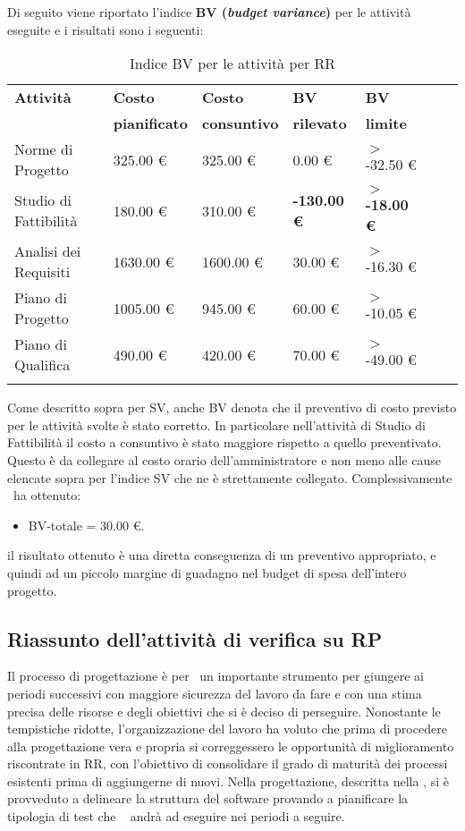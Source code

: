 Di seguito viene riportato l'indice \textbf{BV (\textit{budget variance})} per le attività eseguite e i risultati sono i seguenti:
\begin{longtable}{lllllXr}
\toprule
\textbf{Attività} & \textbf{Costo} & \textbf{Costo} & \textbf{BV} & \textbf{BV} \\
& \textbf{pianificato} & \textbf{consuntivo} & \textbf{rilevato} & \textbf{limite}\\
\toprule
Norme di Progetto & 325.00 € & 325.00 € & 0.00 € & $>$ -32.50 €\\
\midrule
Studio di Fattibilità & 180.00 € & 310.00 € & \textbf{-130.00 €} & \textbf{$>$ -18.00 €}\\
\midrule
Analisi dei Requisiti & 1630.00 € & 1600.00 € & 30.00 € & $>$ -16.30 €\\
\midrule
Piano di Progetto & 1005.00 € & 945.00 € & 60.00 € & $>$ -10.05 €\\
\midrule
Piano di Qualifica & 490.00 € & 420.00 € & 70.00 € & $>$ -49.00 €\\
\bottomrule
\caption{Indice BV per le attività per RR}
\end{longtable}
Come descritto sopra per SV, anche BV denota che il preventivo di costo previsto per le attività svolte è stato corretto.
In particolare nell'attività di Studio di Fattibilità il costo a consuntivo è stato maggiore rispetto a quello preventivato. Questo è da collegare al costo orario dell'amministratore e non meno alle cause elencate sopra per l'indice SV che ne è strettamente collegato.
Complessivamente \gruppo ~ha ottenuto:
\begin{itemize}
\item BV-totale = 30.00 €.
\end{itemize}
il risultato ottenuto è una diretta conseguenza di un preventivo appropriato, e quindi ad un piccolo margine di guadagno nel budget di spesa dell'intero progetto.
\subsection{Riassunto dell'attività di verifica su RP}
Il processo di progettazione è per \gruppo ~un importante strumento per giungere ai periodi successivi con maggiore sicurezza del lavoro da fare e con una stima precisa delle risorse e degli obiettivi che si è deciso di perseguire. Nonostante le tempistiche ridotte, l'organizzazione del lavoro ha voluto che prima di procedere alla progettazione vera e propria si correggessero le opportunità di miglioramento riscontrate in RR, con l'obiettivo di consolidare il grado di maturità dei processi esistenti prima di aggiungerne di nuovi. Nella progettazione, descritta nella \infoST, si è provveduto a delineare la struttura del software provando a pianificare la tipologia di test che \gruppo~ andrà ad eseguire nei periodi a seguire. 

